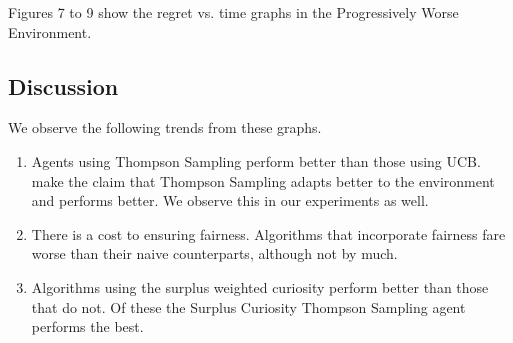 Figures 7 to 9 show the regret vs. time graphs in the Progressively Worse Environment.

\subsection{Discussion}
We observe the following trends from these graphs.

\begin{enumerate}
    \item Agents using Thompson Sampling perform better than those using UCB.  make the claim that Thompson Sampling adapts better to the environment and performs better. We observe this in our experiments as well.
    \item There is a cost to ensuring fairness. Algorithms that incorporate fairness fare worse than their naive counterparts, although not by much. 
    \item Algorithms using the surplus weighted curiosity perform better than those that do not. Of these the Surplus Curiosity Thompson Sampling agent performs the best.
\end{enumerate}


